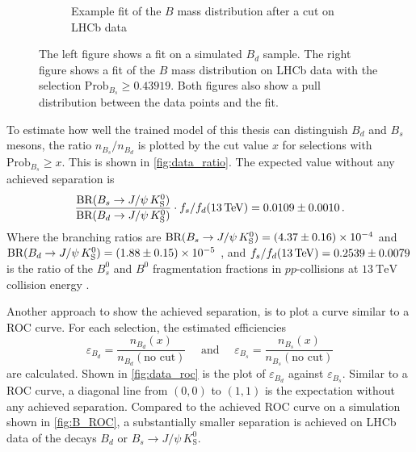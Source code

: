 \begin{figure}
\begin{subfigure}{0.5\textwidth}
        \caption{Example fit of the $B$ mass distribution after a cut on LHCb data}
        \label{fig:fit_example}
    \end{subfigure}%
    \caption{The left figure shows a fit on a simulated $B_d$ sample. The right figure shows a fit of the $B$ mass distribution on LHCb data with the selection $\text{Prob}_{B_s} \geq 0.43919$. Both figures also show a pull distribution between the data points and the fit.}
\end{figure}

To estimate how well the trained model of this thesis can distinguish $B_d$ and $B_s$ mesons, the ratio $n_{B_s}/n_{B_d}$ is plotted by the cut value $x$ for selections with $\text{Prob}_{B_s} \geq x$. 
This is shown in \cref{fig:data_ratio}.
The expected value without any achieved separation is 
\begin{equation}
    \frac{\text{BR}(B_s \rightarrow J/\psi \, K^0_\text{S})}{\text{BR}(B_d \rightarrow J/\psi \, K^0_\text{S})} \cdot 
    f_s/f_d(\qty{13}{\TeV}) = \num{0.0109\pm0.0010} \, .
\end{equation}
Where the branching ratios are $\text{BR}(B_s \rightarrow J/\psi \, K^0_\text{S}) = \num{4.37\pm0.16e-4}$ and $\text{BR}(B_d \rightarrow J/\psi \, K^0_\text{S}) = \num{1.88\pm0.15e-5}$ \cite{pdg}, and $f_s/f_d(\qty{13}{\TeV}) = \num{0.2539\pm0.0079}$ is the ratio of the $B^0_s$ and $B^0$ fragmentation fractions in $pp$-collisions at $\qty{13}{\TeV}$ collision energy \cite{fsfd}.

Another approach to show the achieved separation, is to plot a curve similar to a ROC curve. 
For each selection, the estimated efficiencies
\begin{equation}
    \varepsilon_{B_d} = \frac{n_{B_d}(x)}{n_{B_d}(\text{no cut})} \quad\text{ and }\quad \varepsilon_{B_s} = \frac{n_{B_s}(x)}{n_{B_s}(\text{no cut})}
\end{equation}
are calculated. Shown in \cref{fig:data_roc} is the plot of $\varepsilon_{B_d}$ against $\varepsilon_{B_s}$.
Similar to a ROC curve, a diagonal line from $(0,0)$ to $(1,1)$ is the expectation without any achieved separation.
Compared to the achieved ROC curve on a simulation shown in \cref{fig:B_ROC}, a substantially smaller separation is achieved on LHCb data of the decays $B_d \text{ or } B_s \rightarrow J/\psi \, K^0_\text{S}$.

